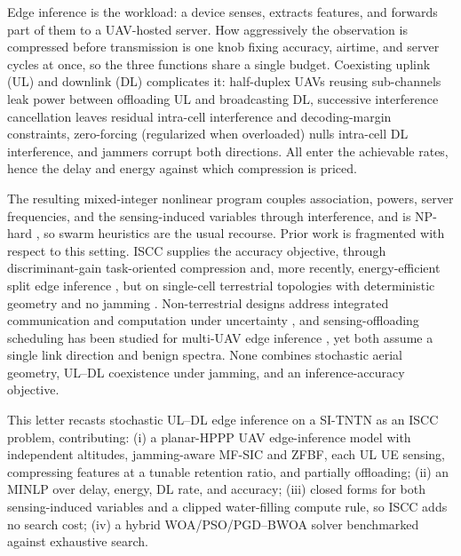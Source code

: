 \documentclass[journal]{IEEEtran}
\begin{document}
Edge inference is the workload: a device senses, extracts features, and forwards part of them to a UAV-hosted server. How aggressively the observation is compressed before transmission is one knob fixing accuracy, airtime, and server cycles at once, so the three functions share a single budget. Coexisting uplink (UL) and downlink (DL) complicates it: half-duplex UAVs reusing sub-channels leak power between offloading UL and broadcasting DL, successive interference cancellation leaves residual intra-cell interference and decoding-margin constraints, zero-forcing (regularized when overloaded) nulls intra-cell DL interference, and jammers corrupt both directions. All enter the achievable rates, hence the delay and energy against which compression is priced.

The resulting mixed-integer nonlinear program couples association, powers, server frequencies, and the sensing-induced variables through interference, and is NP-hard \cite{Hoang_TCOM_2024}, so swarm heuristics \cite{book_SI2010,genetic_optim} are the usual recourse. Prior work is fragmented with respect to this setting. ISCC supplies the accuracy objective, through discriminant-gain task-oriented compression \cite{wen2024iscc} and, more recently, energy-efficient split edge inference \cite{yao2025edgeinf}, but on single-cell terrestrial topologies with deterministic geometry and no jamming \cite{wen2025survey}. Non-terrestrial designs address integrated communication and computation under uncertainty \cite{tang2025ntn}, and sensing-offloading scheduling has been studied for multi-UAV edge inference \cite{du2026uavinf}, yet both assume a single link direction and benign spectra. None combines stochastic aerial geometry, UL--DL coexistence under jamming, and an inference-accuracy objective.

This letter recasts stochastic UL--DL edge inference on a SI-TNTN as an ISCC problem, contributing: (i) a planar-HPPP UAV edge-inference model with independent altitudes, jamming-aware MF-SIC and ZFBF, each UL UE sensing, compressing features at a tunable retention ratio, and partially offloading; (ii) an MINLP over delay, energy, DL rate, and accuracy; (iii) closed forms for both sensing-induced variables and a clipped water-filling compute rule, so ISCC adds no search cost; (iv) a hybrid {WOA/PSO/PGD}--BWOA solver benchmarked against exhaustive search.
\end{document}
